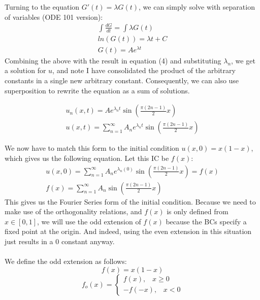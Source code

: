 \documentclass{article}
\begin{document}
Turning to the equation $G'(t) = \lambda G(t)$, we can simply solve with separation of variables (ODE 101 version):
\begin{equation}
\begin{aligned}
\int \frac{dG}{dt} = \int \lambda G(t)\\
ln(G(t)) = \lambda t + C\\
G(t) = Ae^{\lambda t}
\end{aligned}
\end{equation}
Combining the above with the result in equation (4) and substituting $\lambda_n$, we get a solution for $u$, and note I have consolidated the product of the arbitrary constants in a single new arbitrary constant. Consequently, we can also use superposition to rewrite the equation as a sum of solutions.
\begin{tcolorbox}[minipage,colback=white,arc=0pt,outer arc=0pt]
\begin{equation}
\begin{aligned}
u_n(x, t) = Ae^{\lambda_n t}\sin(\frac{\pi(2n-1)}{2}x)\\
u(x, t) = \sum_{n=1}^{\infty} A_ne^{\lambda_n t}\sin(\frac{\pi(2n-1)}{2}x)
\end{aligned}
\end{equation}
\end{tcolorbox}
We now have to match this form to the initial condition $u(x, 0) = x(1-x)$, which gives us the following equation. Let this IC be $f(x)$:
\begin{equation}
\begin{aligned}
u(x, 0) = \sum_{n=1}^{\infty} A_ne^{\lambda_n (0)}\sin(\frac{\pi(2n-1)}{2}x) = f(x)\\ 
f(x) = \sum_{n=1}^{\infty} A_n\sin(\frac{\pi(2n-1)}{2}x)
\end{aligned}
\end{equation}
This gives us the Fourier Series form of the initial condition. Because we need to make use of the orthogonality relations, and $f(x)$ is only defined from $x \in [0, 1]$, we will use the odd extension of $f(x)$ because the BCs specify a fixed point at the origin. And indeed, using the even extension in this situation just results in a $0$ constant anyway.\\
\\
We define the odd extension as follows:
\begin{equation}
f(x) = x(1-x)
\end{equation}
\[f_o(x)=
  \begin{cases}
			f(x), \; \; \; x \geq 0 \\
			-f(-x), \; \; \; x < 0
            \end{cases}
\]
\end{document}
